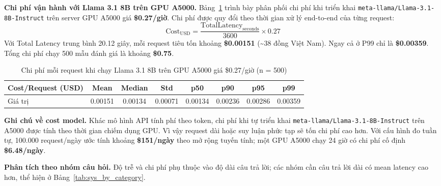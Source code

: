 \textbf{Chi phí vận hành với Llama 3.1 8B trên GPU A5000.}
Bảng~\ref{tab:sys_cost_overall} trình bày phân phối chi phí khi triển khai \texttt{meta-llama/Llama-3.1-8B-Instruct} trên server GPU A5000 giá \textbf{\$0.27/giờ}. Chi phí được quy đổi theo thời gian xử lý end-to-end của từng request:
\[
\text{Cost}_{\text{USD}} = \frac{\text{TotalLatency}_{\text{seconds}}}{3600} \times 0.27
\]
Với Total Latency trung bình 20.12 giây, mỗi request tiêu tốn khoảng \textbf{\$0.00151} (\textasciitilde{}38 đồng Việt Nam). Ngay cả ở P99 chỉ là \textbf{\$0.00359}. Tổng chi phí chạy 500 mẫu đánh giá là khoảng \textbf{\$0.75}.

\begin{table}[H]
\centering
\begin{tabular}{|l|c|c|c|c|c|c|c|}
\hline
\textbf{Cost/Request (USD)} & \textbf{Mean} & \textbf{Median} & \textbf{Std} & \textbf{p50} & \textbf{p90} & \textbf{p95} & \textbf{p99} \\
\hline
Giá trị  & 0.00151 & 0.00134 & 0.00071 & 0.00134 & 0.00236 & 0.00286 & 0.00359 \\
\hline
\end{tabular}
\caption{Chi phí mỗi request khi chạy Llama 3.1 8B trên GPU A5000 giá \$0.27/giờ (n = 500)}
\label{tab:sys_cost_overall}
\end{table}

\noindent\textbf{Ghi chú về cost model.}
Khác mô hình API tính phí theo token, chi phí khi tự triển khai \texttt{meta-llama/Llama-3.1-8B-Instruct} trên A5000 được tính theo thời gian chiếm dụng GPU. Vì vậy request dài hoặc suy luận phức tạp sẽ tốn chi phí cao hơn. Với cấu hình đo tuần tự, 100.000 request/ngày ước tính khoảng \textbf{\$151/ngày} theo mở rộng tuyến tính; một GPU A5000 chạy 24 giờ có chi phí cố định \textbf{\$6.48/ngày}.

\textbf{Phân tích theo nhóm câu hỏi.}
Độ trễ và chi phí phụ thuộc vào độ dài câu trả lời; các nhóm cần câu trả lời dài có mean latency cao hơn, thể hiện ở Bảng~\ref{tab:sys_by_category}.

